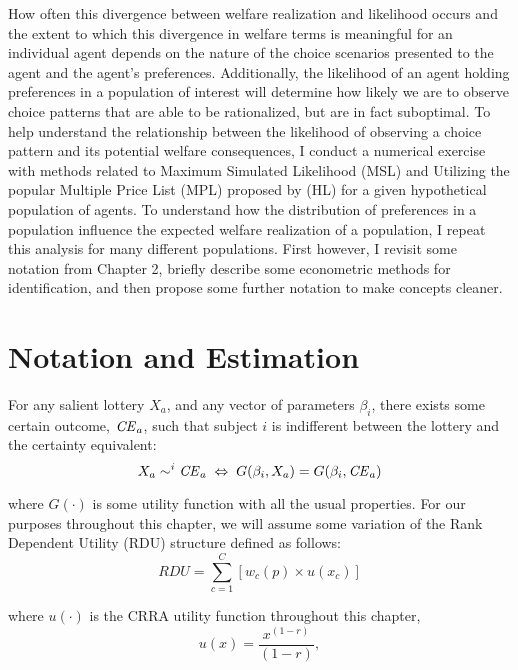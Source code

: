 \documentclass[../main.tex]{subfiles}
\begin{document}
How often this divergence between welfare realization and likelihood occurs and the extent to which this divergence in welfare terms is meaningful for an individual agent depends on the nature of the choice scenarios presented to the agent and the agent's preferences.
Additionally, the likelihood of an agent holding preferences in a population of interest will determine how likely we are to observe choice patterns that are able to be rationalized, but are in fact suboptimal.
To help understand the relationship between the likelihood of observing a choice pattern and its potential welfare consequences, I conduct a numerical exercise with methods related to Maximum Simulated Likelihood (MSL) and Utilizing the popular Multiple Price List (MPL) proposed by \textcite{Holt2002} (HL) for a given hypothetical population of agents.
To understand how the distribution of preferences in a population influence the expected welfare realization of a population, I repeat this analysis for many different populations.
First however, I revisit some notation from Chapter 2, briefly describe some econometric methods for identification, and then propose some further notation to make concepts cleaner.

\section{Notation and Estimation} \label{ssec:Notation}

For any salient lottery $X_a$, and any vector of parameters $\beta_i$, there exists some certain outcome, $\mathit{CE}_a$, such that subject $i$ is indifferent between the lottery and the certainty equivalent:
\begin{equation}
	\label{eq3:CE.indiff}
	X_a \sim^i {\mathit{CE}}_a \;\Leftrightarrow\; G(\beta_i,X_a) = G(\beta_i, {\mathit{CE}}_a)
\end{equation}

\noindent where $G(\cdot)$ is some utility function with all the usual properties.
For our purposes throughout this chapter, we will assume some variation of the Rank Dependent Utility (RDU) structure defined as follows:
\begin{equation}
	\label{eq3:RDU}
	RDU = \sum_{c=1}^{C} \left[ w_c(p) \times u(x_c) \right]
\end{equation}

\noindent where $u(\cdot)$ is the CRRA utility function throughout this chapter,
\begin{equation}
	\label{eq3:CRRA}
	u(x) = \frac{x^{(1-r)}}{(1-r)} ,
\end{equation}
\end{document}
